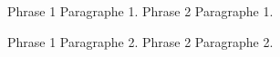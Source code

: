 \documentclass{article}
\begin{document}
	
	Phrase 1 Paragraphe 1. \newline
	Phrase 2 Paragraphe 1. 
	
	Phrase 1 Paragraphe 2. 
	Phrase 2 Paragraphe 2.		
\end{document}
